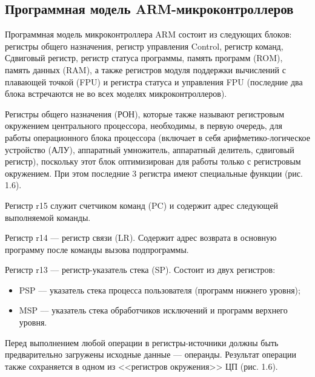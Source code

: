 \documentclass[12pt, oneside]{altsu-report}
\begin{document}
\subsection{Программная модель ARM-микроконтроллеров}

Программная модель микроконтроллера ARM состоит из следующих блоков: регистры общего назначения, регистр управления Control, регистр команд, Сдвиговый регистр, регистр статуса программы, память программ (ROM), память данных (RAM), а также регистров модуля поддержки вычислений с плавающей точкой (FPU) и регистра статуса и управления FPU (последние два блока встречаются не во всех моделях микроконтроллеров).

Регистры общего назначения (РОН), которые также называют регистровым окружением центрального процессора, необходимы, в первую очередь, для работы операционного блока процессора (включает в себя арифметико-логическое устройство (АЛУ), аппаратный умножитель, аппаратный делитель, сдвиговый регистр), поскольку этот блок оптимизирован для работы только с регистровым окружением. При этом последние 3 регистра имеют специальные функции (рис. 1.6).

Регистр r15 служит счетчиком команд (PC) и содержит адрес следующей выполняемой команды.

Регистр r14 --- регистр связи (LR). Содержит адрес возврата в основную программу после команды вызова подпрограммы.

Регистр r13 –-- регистр-указатель стека (SP). Состоит из двух регистров:

\begin{itemize}
    \item PSP –-- указатель стека процесса пользователя (программ нижнего уровня);

    \item MSP –-- указатель стека обработчиков исключений и программ верхнего уровня.
\end{itemize}

Перед выполнением любой операции в регистры-источники должны быть предварительно загружены исходные данные --- операнды. Результат операции также сохраняется в одном из <<регистров окружения>> ЦП (рис. 1.6). 
\end{document}
